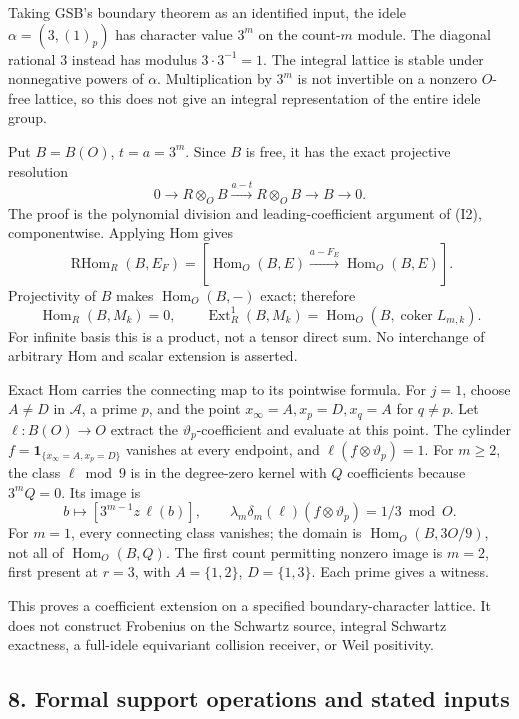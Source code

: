 \documentclass[
  10pt,
]{article}
\begin{document}
Taking GSB's boundary theorem as an identified input, the idele
\(\alpha=(3,(1)_p)\) has character value \(3^m\) on the count-\(m\)
module. The diagonal rational 3 instead has modulus \(3\cdot3^{-1}=1\).
The integral lattice is stable under nonnegative powers of \(\alpha\).
Multiplication by \(3^m\) is not invertible on a nonzero \(O\)-free
lattice, so this does not give an integral representation of the entire
idele group.

Put \(B=B(O)\), \(t=a=3^m\). Since \(B\) is free, it has the exact
projective resolution \[
0\to R\otimes_OB\xrightarrow{a-t}R\otimes_OB\to B\to0.
\] The proof is the polynomial division and leading-coefficient argument
of (I2), componentwise. Applying Hom gives \[
\operatorname{RHom}_R(B,E_F)
=[\operatorname{Hom}_O(B,E)\xrightarrow{a-F_E}
  \operatorname{Hom}_O(B,E)].
\] Projectivity of \(B\) makes \(\operatorname{Hom}_O(B,-)\) exact;
therefore \[
\operatorname{Hom}_R(B,M_k)=0,\qquad
\operatorname{Ext}^1_R(B,M_k)
=\operatorname{Hom}_O(B,\operatorname{coker}L_{m,k}). \tag{I22}
\] For infinite basis this is a product, not a tensor direct sum. No
interchange of arbitrary Hom and scalar extension is asserted.

Exact Hom carries the connecting map to its pointwise formula. For
\(j=1\), choose \(A\ne D\) in \(\mathcal A\), a prime \(p\), and the
point \(x_\infty=A,x_p=D,x_q=A\) for \(q\ne p\). Let \(\ell:B(O)\to O\)
extract the \(\vartheta_p\)-coefficient and evaluate at this point. The
cylinder \(f=\mathbf1_{\{x_\infty=A,x_p=D\}}\) vanishes at every
endpoint, and \(\ell(f\otimes\vartheta_p)=1\). For \(m\ge2\), the class
\(\ell\bmod9\) is in the degree-zero kernel with \(Q\) coefficients
because \(3^mQ=0\). Its image is \[
b\longmapsto[3^{m-1}z\,\ell(b)],\qquad
\lambda_m\delta_m(\ell)(f\otimes\vartheta_p)=1/3\bmod O. \tag{I23}
\] For \(m=1\), every connecting class vanishes; the domain is
\(\operatorname{Hom}_O(B,3O/9)\), not all of
\(\operatorname{Hom}_O(B,Q)\). The first count permitting nonzero image
is \(m=2\), first present at \(r=3\), with \(A=\{1,2\}\), \(D=\{1,3\}\).
Each prime gives a witness.

This proves a coefficient extension on a specified boundary-character
lattice. It does not construct Frobenius on the Schwartz source,
integral Schwartz exactness, a full-idele equivariant collision
receiver, or Weil positivity.

\subsection{8. Formal support operations and stated
inputs}\label{formal-support-operations-and-stated-inputs}
\end{document}
